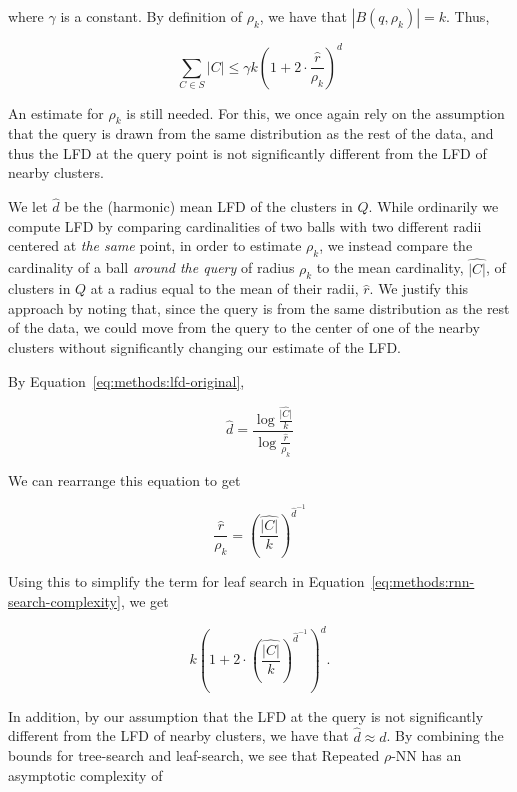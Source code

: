 where $\gamma$ is a constant. 
By definition of $\rho_k$, we have that $|B(q, \rho_k)| = k$.
Thus,

\begin{equation*}
    \sum_{C \in S} |C| \leq \gamma k \left( 1 + 2 \cdot \frac{\hat{r}}{\rho_k} \right)^d
\end{equation*}

An estimate for $\rho_k$ is still needed. 
For this, we once again rely on the assumption that the query is drawn from the same distribution as the rest of the data, and thus the LFD at the query point is not significantly different from the LFD of nearby clusters.

We let $\hat{d}$ be the (harmonic) mean LFD of the clusters in $Q$.
While ordinarily we compute LFD by comparing cardinalities of two balls with two different radii centered at \textit{the same} point, in order to estimate $\rho_k$, we instead compare the cardinality of a ball \textit{around the query} of radius $\rho_k$ to the mean cardinality, $\hat{|C|}$, of clusters in $Q$ at a radius equal to the mean of their radii, $\hat{r}$.
We justify this approach by noting that, since the query is from the same distribution as the rest of the data, we could move from the query to the center of one of the nearby clusters without significantly changing our estimate of the LFD.

By Equation~\ref{eq:methods:lfd-original},

\begin{equation*}
    \hat{d} = \frac{\log{}\frac{\hat{|C|}}{k}}{\log{}\frac{\hat{r}}{\rho_k}}
\end{equation*}

We can rearrange this equation to get

\begin{equation*}
    \frac{\hat{r}}{\rho_k} = \left( \frac{\hat{|C|}}{k} \right)^{\hat{d}^{-1}}
\end{equation*}

Using this to simplify the term for leaf search in Equation~\ref{eq:methods:rnn-search-complexity}, we get

\begin{equation*}
    k \left( 1 + 2 \cdot \left( \frac{\hat{|C|}}{k} \right) ^ {\hat{d}^{-1}} \right)^d.
\end{equation*}

In addition, by our assumption that the LFD at the query is not significantly different from the LFD of nearby clusters, we have that $\hat{d} \approx d$.
By combining the bounds for tree-search and leaf-search, we see that Repeated $\rho$-NN has an asymptotic complexity of

